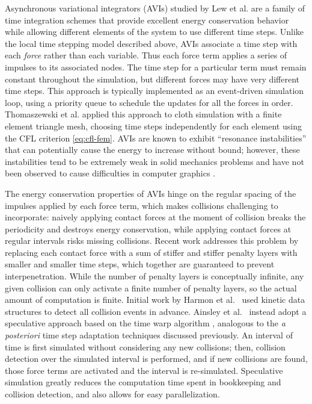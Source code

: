 Asynchronous variational integrators (AVIs) studied by Lew et al. \cite{Lew2004} are a family of time integration schemes that provide excellent energy conservation behavior while allowing different elements of the system to use different time steps.
Unlike the local time stepping model described above, AVIs associate a time step with each \emph{force} rather than each variable.
Thus each force term applies a series of impulses to its associated nodes.
The time step for a particular term must remain constant throughout the simulation, but different forces may have very different time steps.
This approach is typically implemented as an event-driven simulation loop, using a priority queue to schedule the updates for all the forces in order.
Thomaszewski et al. \cite{Thomaszewski2008} applied this approach to cloth simulation with a finite element triangle mesh, choosing time steps independently for each element using the CFL criterion \eqref{eq:cfl-fem}.
AVIs are known to exhibit ``resonance instabilities'' that can potentially cause the energy to increase without bound; however, these instabilities tend to be extremely weak in solid mechanics problems \cite{Fong2007} and have not been observed to cause difficulties in computer graphics \cite{Harmon2009}.

The energy conservation properties of AVIs hinge on the regular spacing of the impulses applied by each force term, which makes collisions challenging to incorporate: naively applying contact forces at the moment of collision breaks the periodicity and destroys energy conservation, while applying contact forces at regular intervals risks missing collisions.
Recent work \cite{Harmon2009,Ainsley2012} addresses this problem by replacing each contact force with a sum of stiffer and stiffer penalty layers with smaller and smaller time steps, which together are guaranteed to prevent interpenetration.
While the number of penalty layers is conceptually infinite, any given collision can only activate a finite number of penalty layers, so the actual amount of computation is finite.
Initial work by Harmon et al.~\cite{Harmon2009} used kinetic data structures to detect all collision events in advance.
Ainsley et al.~\cite{Ainsley2012} instead adopt a speculative approach based on the time warp algorithm \cite{Jefferson1985, Mirtich2000}, analogous to the \textit{a posteriori} time step adaptation techniques discussed previously.
An interval of time is first simulated without considering any new collisions; then, collision detection over the simulated interval is performed, and if new collisions are found, those force terms are activated and the interval is re-simulated.
Speculative simulation greatly reduces the computation time spent in bookkeeping and collision detection, and also allows for easy parallelization.

